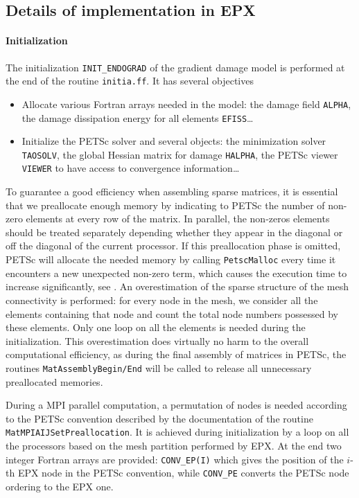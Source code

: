 \subsection{Details of implementation in EPX} \label{sec:epx}
\paragraph{Initialization}
The initialization \texttt{INIT\_ENDOGRAD} of the gradient damage model is performed at the end of the routine \texttt{initia.ff}. It has several objectives
\begin{itemize}
\item Allocate various Fortran arrays needed in the model: the damage field \texttt{ALPHA}, the damage dissipation energy for all elements \texttt{EFISS}\ldots

\item Initialize the PETSc solver and several objects: the minimization solver \texttt{TAOSOLV}, the global Hessian matrix for damage \texttt{HALPHA}, the PETSc viewer \texttt{VIEWER} to have access to convergence information\ldots
\end{itemize}

To guarantee a good efficiency when assembling sparse matrices, it is essential that we preallocate enough memory by indicating to PETSc the number of non-zero elements at every row of the matrix. In parallel, the non-zeros elements should be treated separately depending whether they appear in the diagonal or off the diagonal of the current processor. If this preallocation phase is omitted, PETSc will allocate the needed memory by calling \texttt{PetscMalloc} every time it encounters a new unexpected non-zero term, which causes the execution time to increase significantly, see \cite{PETSc:2015}. An overestimation of the sparse structure of the mesh connectivity is performed: for every node in the mesh, we consider all the elements containing that node and count the total node numbers possessed by these elements. Only one loop on all the elements is needed during the initialization. This overestimation does virtually no harm to the overall computational efficiency, as during the final assembly of matrices in PETSc, the routines \texttt{MatAssemblyBegin/End} will be called to release all unnecessary preallocated memories.

During a MPI parallel computation, a permutation of nodes is needed according to the PETSc convention described by the documentation of the routine \texttt{MatMPIAIJSetPreallocation}. It is achieved during initialization by a loop on all the processors based on the mesh partition performed by EPX. At the end two integer Fortran arrays are provided: \texttt{CONV\_EP(I)} which gives the position of the $i$-th EPX node in the PETSc convention, while \texttt{CONV\_PE} converts the PETSc node ordering to the EPX one.

